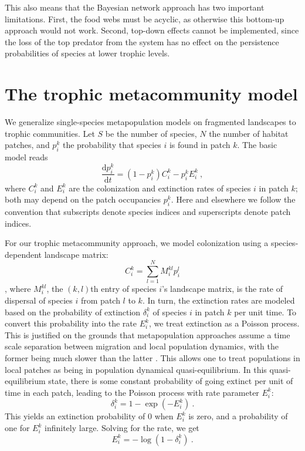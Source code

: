 \documentclass[11pt]{article}
\newcommand{\ud}{\text{d}}
\begin{document}
This also means that the Bayesian network approach has two important limitations. First, the food webs must be acyclic, as otherwise this bottom-up approach would not work. Second, top-down effects cannot be implemented, since the loss of the top predator from the system has no effect on the persistence probabilities of species at lower trophic levels.


\section{The trophic metacommunity model} \label{sec:tmm}

We generalize single-species metapopulation models on fragmented landscapes \citep{HanskiOvaskainen2000, OvaskainenHanski2001, HanskiOvaskainen2003, Grillietal2015} to trophic communities. Let $S$ be the number of species, $N$ the number of habitat patches, and $p_i^k$ the probability that species $i$ is found in patch $k$. The basic model reads
\begin{equation}
  \label{eq:model}
  \frac{\ud p_i^k}{\ud t} = (1 - p_i^k) C_i^k - p_i^k E_i^k \ ,
\end{equation}
where $C_i^k$ and $E_i^k$ are the colonization and extinction rates of species $i$ in patch $k$; both may depend on the patch occupancies $p_i^k$. Here and elsewhere we follow the convention that subscripts denote species indices and superscripts denote patch indices.

For our trophic metacommunity approach, we model colonization using a species-dependent landscape matrix:
\begin{equation}
  \label{eq:colonization}
  C_i^k = \sum_{l=1}^N M_i^{kl} p_i^l
\end{equation}
\citep{OvaskainenHanski2001}, where $M_i^{kl}$, the $(k,l)$th entry of species $i$'s landscape matrix, is the rate of dispersal of species $i$ from patch $l$ to $k$. In turn, the extinction rates are modeled based on the probability of extinction $\delta_i^k$ of species $i$ in patch $k$ per unit time. To convert this probability into the rate $E_i^k$, we treat extinction as a Poisson process. This is justified on the grounds that metapopulation approaches assume a time scale separation between migration and local population dynamics, with the former being much slower than the latter \citep{Hanski1994}. This allows one to treat populations in local patches as being in population dynamical quasi-equilibrium. In this quasi-equilibrium state, there is some constant probability of going extinct per unit of time in each patch, leading to the Poisson process with rate parameter $E_i^k$:
\begin{equation}
  \label{eq:probrate}
  \delta_i^k = 1 - \exp(-E_i^k) \ .
\end{equation}
This yields an extinction probability of $0$ when $E_i^k$ is zero, and a probability of one for $E_i^k$ infinitely large. Solving for the rate, we get
\begin{equation}
  \label{eq:extinction}
  E_i^k = -\log(1 - \delta_i^k) \ .
\end{equation}
\end{document}
